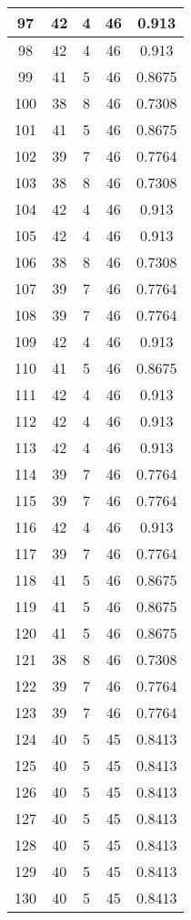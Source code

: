 \documentclass[letterpaper, 12pt]{article}
\begin{document}
\begin{longtable}{|c|c|c|c|c|}
\hline
97 & 42 & 4 & 46 & 0.913 \\
\hline
98 & 42 & 4 & 46 & 0.913 \\
\hline
99 & 41 & 5 & 46 & 0.8675 \\
\hline
100 & 38 & 8 & 46 & 0.7308 \\
\hline
101 & 41 & 5 & 46 & 0.8675 \\
\hline
102 & 39 & 7 & 46 & 0.7764 \\
\hline
103 & 38 & 8 & 46 & 0.7308 \\
\hline
104 & 42 & 4 & 46 & 0.913 \\
\hline
105 & 42 & 4 & 46 & 0.913 \\
\hline
106 & 38 & 8 & 46 & 0.7308 \\
\hline
107 & 39 & 7 & 46 & 0.7764 \\
\hline
108 & 39 & 7 & 46 & 0.7764 \\
\hline
109 & 42 & 4 & 46 & 0.913 \\
\hline
110 & 41 & 5 & 46 & 0.8675 \\
\hline
111 & 42 & 4 & 46 & 0.913 \\
\hline
112 & 42 & 4 & 46 & 0.913 \\
\hline
113 & 42 & 4 & 46 & 0.913 \\
\hline
114 & 39 & 7 & 46 & 0.7764 \\
\hline
115 & 39 & 7 & 46 & 0.7764 \\
\hline
116 & 42 & 4 & 46 & 0.913 \\
\hline
117 & 39 & 7 & 46 & 0.7764 \\
\hline
118 & 41 & 5 & 46 & 0.8675 \\
\hline
119 & 41 & 5 & 46 & 0.8675 \\
\hline
120 & 41 & 5 & 46 & 0.8675 \\
\hline
121 & 38 & 8 & 46 & 0.7308 \\
\hline
122 & 39 & 7 & 46 & 0.7764 \\
\hline
123 & 39 & 7 & 46 & 0.7764 \\
\hline
124 & 40 & 5 & 45 & 0.8413 \\
\hline
125 & 40 & 5 & 45 & 0.8413 \\
\hline
126 & 40 & 5 & 45 & 0.8413 \\
\hline
127 & 40 & 5 & 45 & 0.8413 \\
\hline
128 & 40 & 5 & 45 & 0.8413 \\
\hline
129 & 40 & 5 & 45 & 0.8413 \\
\hline
130 & 40 & 5 & 45 & 0.8413 \\

\end{longtable}
\end{document}

